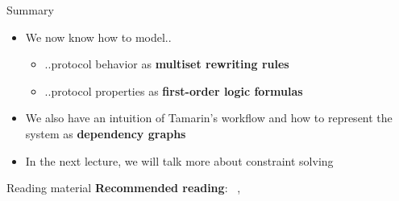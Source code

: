 \documentclass[11pt,aspectratio=169]{beamer}
\begin{document}

\begin{frame}[fragile]{Summary}
    \begin{itemize}
        \item We now know how to model..
        \begin{itemize}
            \item ..protocol behavior as \textbf{multiset rewriting rules}
            \item ..protocol properties as \textbf{first-order logic formulas}
        \end{itemize}
        \item We also have an intuition of Tamarin's workflow and how to 
              represent the system as \textbf{dependency graphs}
        \item In the next lecture, we will talk more about constraint solving
    \end{itemize}
\end{frame}

\begin{frame}[fragile]{Reading material}
    \textbf{Recommended reading}:
        ~\cite[Ch. 6--6.5]{tamarin-book},
        ~\cite{schmidt2012tamarin}
    \printbibliography[heading=none]
\end{frame}
\end{document}

